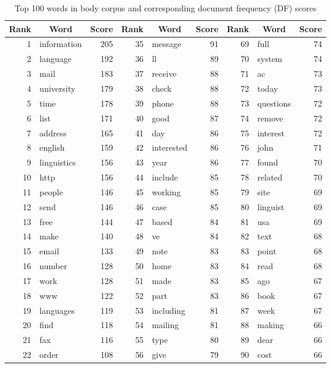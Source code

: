 \documentclass[10pt, a4paper]{article}
\begin{document}
\begin{table}[H]
\centering
\caption{Top 100 words in body corpus and corresponding document frequency (DF) scores}
\begin{tabular}{@{}rlrrlrrlr@{}}
\toprule
\textbf{Rank} & \multicolumn{1}{c}{\textbf{Word}} & \textbf{Score}
	& \textbf{Rank} & \multicolumn{1}{c}{\textbf{Word}} & \textbf{Score}
	& \textbf{Rank} & \multicolumn{1}{c}{\textbf{Word}} & \textbf{Score}\\
\midrule
1 & information & 205 & 35 & message & 91 & 69 & full & 74 \\
2 & language & 192 & 36 & ll & 89 & 70 & system & 74 \\
3 & mail & 183 & 37 & receive & 88 & 71 & ac & 73 \\
4 & university & 179 & 38 & check & 88 & 72 & today & 73 \\
5 & time & 178 & 39 & phone & 88 & 73 & questions & 72 \\
6 & list & 171 & 40 & good & 87 & 74 & remove & 72 \\
7 & address & 165 & 41 & day & 86 & 75 & interest & 72 \\
8 & english & 159 & 42 & interested & 86 & 76 & john & 71 \\
9 & linguistics & 156 & 43 & year & 86 & 77 & found & 70 \\
10 & http & 156 & 44 & include & 85 & 78 & related & 70 \\
11 & people & 146 & 45 & working & 85 & 79 & site & 69 \\
12 & send & 146 & 46 & case & 85 & 80 & linguist & 69 \\
13 & free & 144 & 47 & based & 84 & 81 & usa & 69 \\
14 & make & 140 & 48 & ve & 84 & 82 & text & 68 \\
15 & email & 133 & 49 & note & 83 & 83 & point & 68 \\
16 & number & 128 & 50 & home & 83 & 84 & read & 68 \\
17 & work & 128 & 51 & made & 83 & 85 & ago & 67 \\
18 & www & 122 & 52 & part & 83 & 86 & book & 67 \\
19 & languages & 119 & 53 & including & 81 & 87 & week & 67 \\
20 & find & 118 & 54 & mailing & 81 & 88 & making & 66 \\
21 & fax & 116 & 55 & type & 80 & 89 & dear & 66 \\
22 & order & 108 & 56 & give & 79 & 90 & cost & 66 \\

\end{tabular}
\end{table}
\end{document}
